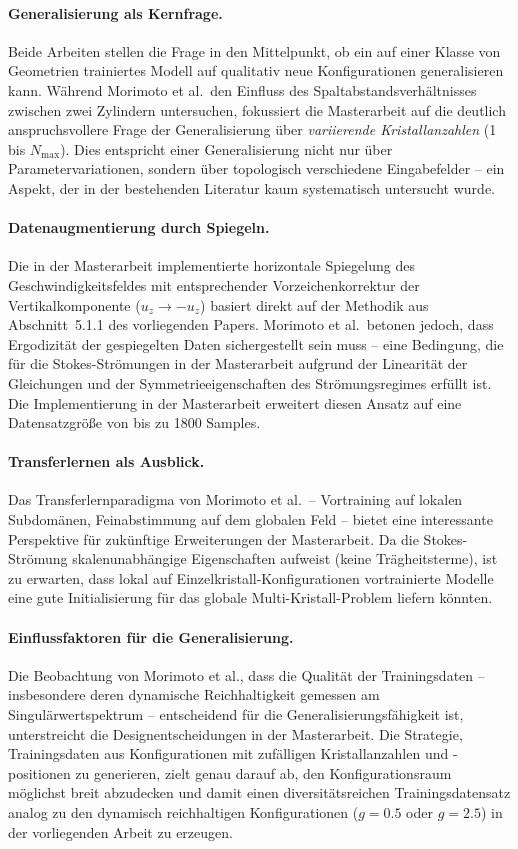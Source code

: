 \documentclass[a4paper,12pt]{article}
\begin{document}
\paragraph{Generalisierung als Kernfrage.}
Beide Arbeiten stellen die Frage in den Mittelpunkt, ob ein auf einer Klasse von Geometrien trainiertes Modell auf qualitativ neue Konfigurationen generalisieren kann. Während Morimoto et al.\ den Einfluss des Spaltabstandsverhältnisses zwischen zwei Zylindern untersuchen, fokussiert die Masterarbeit auf die deutlich anspruchsvollere Frage der Generalisierung über \textit{variierende Kristallanzahlen} (1 bis $N_\text{max}$). Dies entspricht einer Generalisierung nicht nur über Parametervariationen, sondern über topologisch verschiedene Eingabefelder -- ein Aspekt, der in der bestehenden Literatur kaum systematisch untersucht wurde.

\paragraph{Datenaugmentierung durch Spiegeln.}
Die in der Masterarbeit implementierte horizontale Spiegelung des Geschwindigkeitsfeldes mit entsprechender Vorzeichenkorrektur der Vertikalkomponente ($u_z \to -u_z$) basiert direkt auf der Methodik aus Abschnitt~5.1.1 des vorliegenden Papers. Morimoto et al.\ betonen jedoch, dass Ergodizität der gespiegelten Daten sichergestellt sein muss -- eine Bedingung, die für die Stokes-Strömungen in der Masterarbeit aufgrund der Linearität der Gleichungen und der Symmetrieeigenschaften des Strömungsregimes erfüllt ist. Die Implementierung in der Masterarbeit erweitert diesen Ansatz auf eine Datensatzgröße von bis zu 1800 Samples.

\paragraph{Transferlernen als Ausblick.}
Das Transferlernparadigma von Morimoto et al.\ -- Vortraining auf lokalen Subdomänen, Feinabstimmung auf dem globalen Feld -- bietet eine interessante Perspektive für zukünftige Erweiterungen der Masterarbeit. Da die Stokes-Strömung skalenunabhängige Eigenschaften aufweist (keine Trägheitsterme), ist zu erwarten, dass lokal auf Einzelkristall-Konfigurationen vortrainierte Modelle eine gute Initialisierung für das globale Multi-Kristall-Problem liefern könnten.

\paragraph{Einflussfaktoren für die Generalisierung.}
Die Beobachtung von Morimoto et al., dass die Qualität der Trainingsdaten -- insbesondere deren dynamische Reichhaltigkeit gemessen am Singulärwertspektrum -- entscheidend für die Generalisierungsfähigkeit ist, unterstreicht die Designentscheidungen in der Masterarbeit. Die Strategie, Trainingsdaten aus Konfigurationen mit zufälligen Kristallanzahlen und -positionen zu generieren, zielt genau darauf ab, den Konfigurationsraum möglichst breit abzudecken und damit einen diversitätsreichen Trainingsdatensatz analog zu den dynamisch reichhaltigen Konfigurationen ($g = 0.5$ oder $g = 2.5$) in der vorliegenden Arbeit zu erzeugen.
\end{document}

